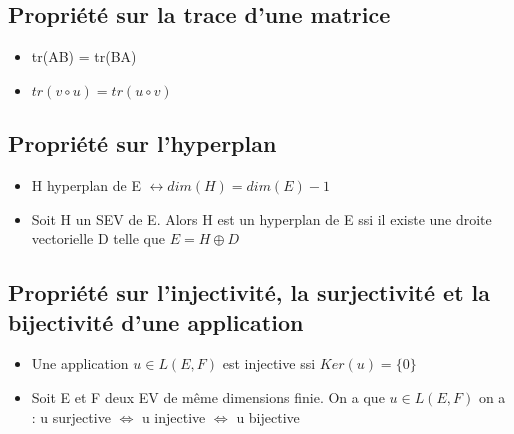 \documentclass{article}
\begin{document}
\subsection{Propriété sur la trace d'une matrice}
\begin{itemize}[label=$\ast$]
	\item tr(AB) = tr(BA)
	\item \(tr(v \circ u) = tr(u \circ v) \)
\end{itemize}

\subsection{Propriété sur l'hyperplan}
\begin{itemize}[label=$\ast$]
	\item H hyperplan de E \( \leftrightarrow dim(H) = dim(E)-1 \)
	\item Soit H un SEV de E. Alors H est un hyperplan de E ssi il existe une droite vectorielle D telle que \(E = H \oplus D \)
\end{itemize}

\subsection{Propriété sur l'injectivité, la surjectivité et la bijectivité d'une application}
\begin{itemize}[label=$\ast$]
	\item Une application \(u \in L(E,F) \) est injective ssi \(Ker(u) = \{0\} \)
	\item Soit E et F deux EV de même dimensions finie. On a que \(u \in L(E,F) \) on a :  u surjective \( \Leftrightarrow \) u injective \( \Leftrightarrow \) u bijective
\end{itemize}
\end{document}
